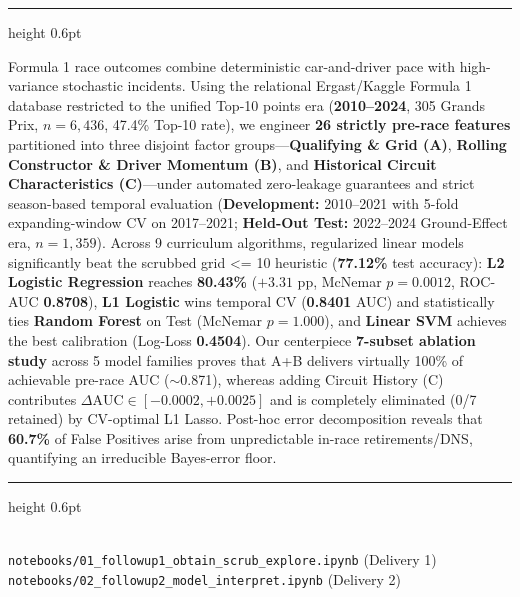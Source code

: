 \documentclass[10pt,a4paper,twocolumn]{article}
\newcommand{\code}[1]{{\fontsize{8.5pt}{10pt}\selectfont\ttfamily #1}}
\begin{document}
\begin{titlepage}
  \begin{minipage}{0.88\textwidth}
    {\color{ruledark}\hrule height 0.6pt}
    \vspace{10pt}
    \begin{center}
      {\small\scshape\bfseries{}}
    \end{center}
    \vspace{2pt}
    {\fontsize{9.2pt}{12.4pt}\selectfont
    \noindent Formula 1 race outcomes combine deterministic car-and-driver pace with high-variance stochastic incidents. Using the relational Ergast/Kaggle Formula 1 database restricted to the unified Top-10 points era (\textbf{2010--2024}, 305 Grands Prix, $n=6{,}436$, 47.4\% Top-10 rate), we engineer \textbf{26 strictly pre-race features} partitioned into three disjoint factor groups---\textbf{Qualifying \& Grid (A)}, \textbf{Rolling Constructor \& Driver Momentum (B)}, and \textbf{Historical Circuit Characteristics (C)}---under automated zero-leakage guarantees and strict season-based temporal evaluation (\textbf{Development:} 2010--2021 with 5-fold expanding-window CV on 2017--2021; \textbf{Held-Out Test:} 2022--2024 Ground-Effect era, $n=1{,}359$). Across 9 curriculum algorithms, regularized linear models significantly beat the scrubbed \code{grid <= 10} heuristic (\textbf{77.12\%} test accuracy): \textbf{L2 Logistic Regression} reaches \textbf{80.43\%} ($+3.31$ pp, McNemar $p=0.0012$, ROC-AUC \textbf{0.8708}), \textbf{L1 Logistic} wins temporal CV (\textbf{0.8401} AUC) and statistically ties \textbf{Random Forest} on Test (McNemar $p=1.000$), and \textbf{Linear SVM} achieves the best calibration (Log-Loss \textbf{0.4504}). Our centerpiece \textbf{7-subset ablation study} across 5 model families proves that \code{A+B} delivers virtually 100\% of achievable pre-race AUC ($\sim$0.871), whereas adding Circuit History (\code{C}) contributes $\Delta\text{AUC} \in [-0.0002, +0.0025]$ and is completely eliminated (0/7 retained) by CV-optimal L1 Lasso. Post-hoc error decomposition reveals that \textbf{60.7\%} of False Positives arise from unpredictable in-race retirements/DNS, quantifying an irreducible Bayes-error floor.\par}
    \vspace{10pt}
    {\color{ruledark}\hrule height 0.6pt}
  \end{minipage}

  \vfill

  \begin{minipage}{0.88\textwidth}
    \centering
    {\footnotesize\scshape{}}\\[4pt]
    {\footnotesize\color{muted}
      \texttt{notebooks/01\_followup1\_obtain\_scrub\_explore.ipynb} (Delivery 1)\\[1.5pt]
      \texttt{notebooks/02\_followup2\_model\_interpret.ipynb} (Delivery 2)
    }
  \end{minipage}


\end{titlepage}
\end{document}
